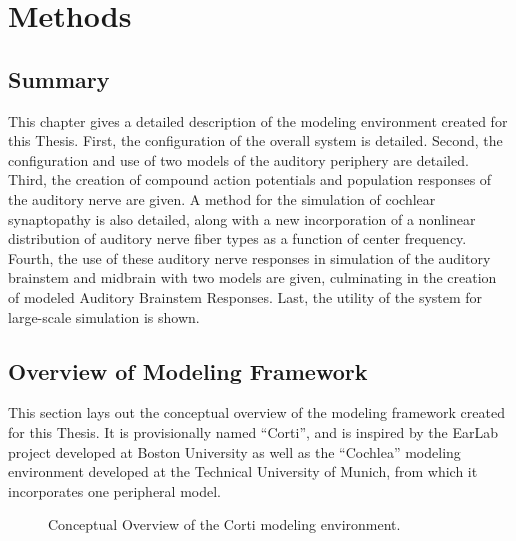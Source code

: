\chapter{Methods}
\label{chapter:Methods}
\thispagestyle{myheadings}

\graphicspath{{4_Methods/Figures/}}

\section{Summary} %
\label{sec:summary}
This chapter gives a detailed description of the modeling environment created for this Thesis.  First, the configuration of the overall system is detailed.  Second, the configuration and use of two models of the auditory periphery are detailed.  Third, the creation of compound action potentials and population responses of the auditory nerve are given.  A method for the simulation of cochlear synaptopathy is also detailed, along with a new incorporation of a nonlinear distribution of auditory nerve fiber types as a function of center frequency.  Fourth, the use of these auditory nerve responses in simulation of the auditory brainstem and midbrain with two models are given, culminating in the creation of modeled Auditory Brainstem Responses.  Last, the utility of the system for large-scale simulation is shown. 

\section{Overview of Modeling Framework} %
\label{sec:overview_of_modeling_framework}
This section lays out the conceptual overview of the modeling framework created for this Thesis.  It is provisionally named ``Corti''\cite{Voysey2016Corti}, and is inspired by the EarLab project developed at Boston University as well as the ``Cochlea''\cite{Rudnicki2014Cochlea} modeling environment developed at the Technical University of Munich, from which it incorporates one peripheral model. 

\begin{figure}[htbp]
	\centering
	\caption{Conceptual Overview of the Corti modeling environment.}
	\label{fig:corti-overview}
	\end{figure}

